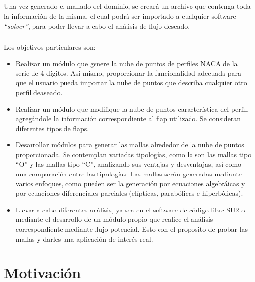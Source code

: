 \documentclass[letterpaper, openright, 12pt]{book}
\begin{document}
    \paragraph*{}
    Una vez generado el mallado del dominio, se creará un archivo que
    contenga toda la información de la misma, el cual podrá ser importado a
    cualquier software \textit{``solver''}, para poder llevar a cabo el
    análisis de flujo deseado.

    \paragraph*{}
    Los objetivos particulares son:
        \begin{itemize}
            \item{Realizar un módulo que genere la nube de puntos de perfiles
                NACA de la serie de 4 dígitos. Así mismo, proporcionar la
                funcionalidad adecuada para que el usuario pueda importar la
                nube de puntos que describa cualquier otro perfil deaseado.}
            \item{Realizar un módulo que modifique la nube de puntos
                característica del perfil, agregándole la información
                correspondiente al flap utilizado. Se consideran
                diferentes tipos de flaps.}
            \item{Desarrollar módulos para generar las mallas alrededor de la
                nube de puntos proporcionada. Se contemplan variadas tipologías,
                como lo son las mallas tipo “O” y las mallas tipo “C”,
                analizando sus ventajas y desventajas, así como una comparación
                entre las tipologías. Las mallas serán generadas mediante varios
                enfoques, como pueden ser la generación por ecuaciones
                algebráicas y por ecuaciones diferenciales parciales (elípticas,
                parabólicas e hiperbólicas).}
            \item{Llevar a cabo diferentes análisis, ya sea en el software de
                código libre SU2 o mediante el desarrollo de un módulo propio
                que realice el análisis correspondiente mediante flujo 
                potencial. Esto con el proposito de probar las mallas y darles
                una aplicación de interés real.}
        \end{itemize}




    \chapter*{Motivación}
\end{document}
